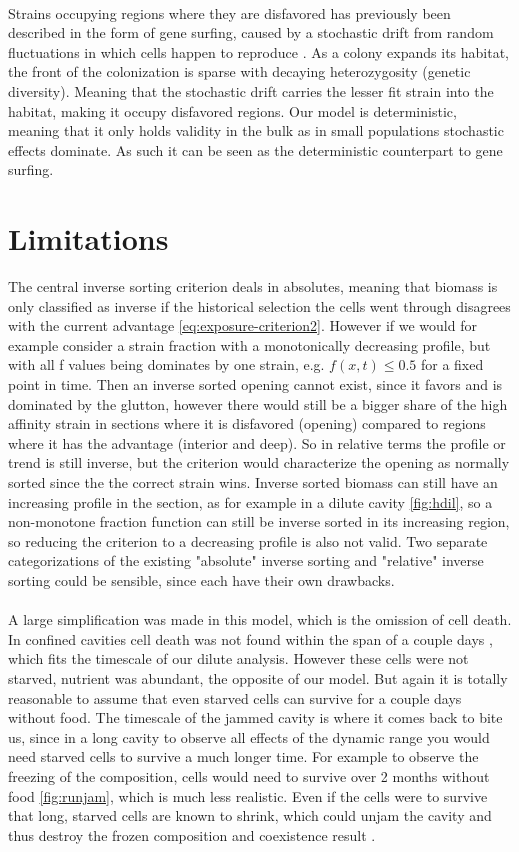 \documentclass[11pt,a4paper]{report}
\begin{document}
	\\
	Strains occupying regions where they are disfavored has previously been described in the form of gene surfing, caused by a stochastic drift from random fluctuations in which cells happen to reproduce \cite{gene, lifeexp, stepping}. As a colony expands its habitat, the front of the colonization is sparse with decaying heterozygosity (genetic diversity). Meaning that the stochastic drift carries the lesser fit strain into the habitat, making it occupy disfavored regions. Our model is deterministic, meaning that it only holds validity in the bulk as in small populations stochastic effects dominate. As such it can be seen as the deterministic counterpart to gene surfing.
	\section{Limitations}
	The central inverse sorting criterion deals in absolutes, meaning that biomass is only classified as inverse if the historical selection the cells went through disagrees with the current advantage \eqref{eq:exposure-criterion2}. However if we would for example consider a strain fraction with a monotonically decreasing profile, but with all f values being dominates by one strain, e.g. $f(x,t)\le0.5$ for a fixed point in time. Then an inverse sorted opening cannot exist, since it favors and is dominated by the glutton, however there would still be a bigger share of the high affinity strain in sections where it is disfavored (opening) compared to regions where it has the advantage (interior and deep). So in relative terms the profile or trend is still inverse, but the criterion would characterize the opening as normally sorted since the the correct strain wins. Inverse sorted biomass can still have an increasing profile in the section, as for example in a dilute cavity \ref{fig:hdil}, so a non-monotone fraction function can still be inverse sorted in its increasing region, so reducing the criterion to a decreasing profile is also not valid. Two separate categorizations of the existing "absolute" inverse sorting and "relative" inverse sorting could be sensible, since each have their own drawbacks.\\
	\\
	A large simplification was made in this model, which is the omission of cell death. In confined cavities cell death was not found within the span of a couple days \cite{Karita}, which fits the timescale of our dilute analysis. However these cells were not starved, nutrient was abundant, the opposite of our model. But again it is totally reasonable to assume that even starved cells can survive for a couple days without food. The timescale of the jammed cavity is where it comes back to bite us, since in a long cavity to observe all effects of the dynamic range you would need starved cells to survive a much longer time. For example to observe the freezing of the composition, cells would need to survive over 2 months without food \ref{fig:runjam}, which is much less realistic. Even if the cells were to survive that long, starved cells are known to shrink, which could unjam the cavity and thus destroy the frozen composition and coexistence result \cite{starved}.\\
\end{document}
